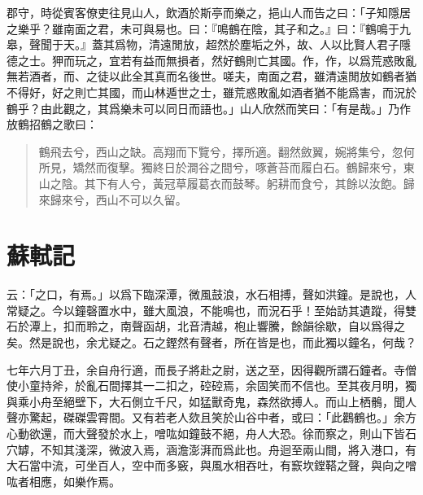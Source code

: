 郡守，時從賓{客}僚吏往見山人，飲酒於斯亭而樂之，挹山人而告之曰：「子知隱居之樂乎？雖南面之君，未可與易也。曰：『鳴鶴在陰，其子和之。』曰：『鶴鳴于九皋，聲聞于天。』蓋其爲物，清遠閒放，超然於塵垢之外，故、人以比賢人君子隱德之士。狎而玩之，宜若有益而無損者，然好鶴則亡其國。作，作，以爲荒惑敗亂無若酒者，而、之徒以此全其真而名後世。嗟夫，南面之君，雖清遠閒放如鶴者猶不得好，好之則亡其國，而山林{遁}世之士，雖荒惑敗亂如酒者猶不能爲害，而況於鶴乎？由此觀之，其爲樂未可以同日而語也。」山人欣然而笑曰：「有是哉。」乃作放鶴招鶴之歌曰： %

\begin{quote}
    鶴飛去兮，西山之缺。高翔而下覽兮，擇所適。翻然斂翼，婉將集兮，忽何所見，矯然而復擊。獨終日於澗谷之間兮，啄蒼苔而履白石。鶴歸來兮，東山之陰。其下有人兮，黃冠草履葛衣而鼓琴。躬耕而食兮，其餘以汝飽。歸來歸來兮，西山不可以久留。
\end{quote}

\theendnotes

\section[石鐘山記\quad{\small 蘇軾}]{{\normalsize 蘇軾}\quad {}記}
云：「之口，有焉。」以爲下臨深潭，微風鼓浪，水石相搏，聲如洪鐘。是說也，人常疑之。今以鐘磬置水中，雖大風浪，不能鳴也，而況石乎！至始訪其遺蹤，得雙石於潭上，扣而聆之，南聲函胡，北音清越，枹止響騰，餘韻徐歇，自以爲得之矣。然是說也，余尤疑之。石之鏗然有聲者，所在皆是也，而此獨以鐘名，何哉？

七年六月丁丑，余自舟行適，而長子將赴之尉，送之至，因得觀所謂石鐘者。寺僧使小童持斧，於亂石間擇其一二扣之，硿硿{焉}，余固笑而不信也。至其夜月明，獨與乘小舟至絕壁下，大石側立千尺，如猛獸奇鬼，森然欲搏人。而山上栖鶻，聞人聲亦驚起，磔磔雲霄間。又有若老人欬且笑於山谷中者，或曰：「此鸛鶴也。」余方心動欲還，而大聲發於水上，噌吰如鐘鼓不絕，舟人大恐。徐而察之，則山下皆石穴罅，不知其淺深，微波入焉，涵澹澎湃而爲此也。舟迴至兩山間，將入港口，有大石當中流，可坐百人，空中而多竅，與風水相吞吐，有窾坎鏜鞳之聲，與向之噌吰者相應，如樂作焉。%

